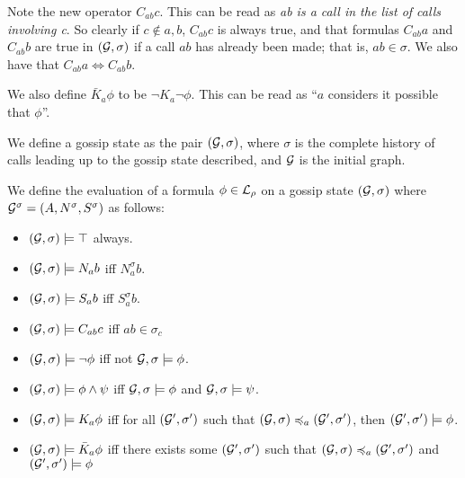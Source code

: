 \documentclass[12pt, a4paper]{article} %
\begin{document}
Note the new operator $C_{ab} c$. This can be read as \textit{ab is a call in the list of calls involving c}. So clearly if $c \not \in {a, b}$, $C_{ab} c$ is always true, and that formulas $C_{ab} a$ and $C_{ab} b$ are true in $(\mathcal{G}, \sigma)$ if a call $ab$ has already been made; that is, $ab \in \sigma$. We also have that $C_{ab} a \iff C_{ab} b$. 

We also define $\bar{K}_a \phi$ to be $\neg K_a \neg \phi$. This can be read as ``$a$ considers it possible that $\phi$''. 

We define a gossip state as the pair $(\mathcal{G}, \sigma)$, where $\sigma$ is the complete history of calls leading up to the gossip state described, and $\mathcal{G}$ is the initial graph.

We define the evaluation of a formula $\phi \in \mathcal{L}_\rho$ on a gossip state $(\mathcal{G}, \sigma)$ where $\mathcal{G}^\sigma = (A, N^\sigma, S^\sigma)$ as follows:

\begin{itemize}
    \item $\left(\mathcal{G}, \sigma\right) \models \top$ always.
    \item $\left(\mathcal{G}, \sigma\right) \models N_a b$ iff $N_a^\sigma b$.
    \item $\left(\mathcal{G}, \sigma\right) \models S_a b$ iff $S_a^\sigma b$.
    \item $\left(\mathcal{G}, \sigma\right) \models C_{ab} c$ iff $ab \in \sigma_c$
    \item $\left(\mathcal{G}, \sigma\right) \models \neg \phi$ iff not $\mathcal{G}, \sigma \models \phi$.
    \item $\left(\mathcal{G}, \sigma\right) \models \phi \land \psi$ iff $\mathcal{G}, \sigma \models \phi$ and $\mathcal{G}, \sigma \models \psi$.
    \item $\left(\mathcal{G}, \sigma\right) \models K_a \phi$ iff for all $\left(\mathcal{G}', \sigma'\right)$ such that $\left(\mathcal{G}, \sigma\right) \preccurlyeq_a \left(\mathcal{G}', \sigma'\right)$, then $\left(\mathcal{G}', \sigma'\right) \models \phi$.
    \item $\left(\mathcal{G}, \sigma\right) \models \bar{K}_a \phi$ iff there exists some $\left(\mathcal{G}', \sigma'\right)$ such that $\left(\mathcal{G}, \sigma\right) \preccurlyeq_a \left(\mathcal{G}', \sigma'\right)$ and $\left(\mathcal{G}', \sigma'\right) \models \phi$
\end{itemize}
\end{document}
